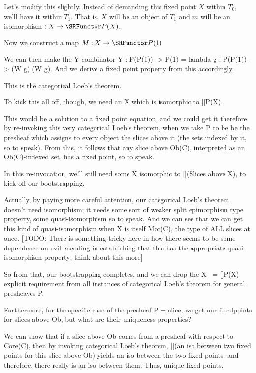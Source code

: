 Let's modify this slightly. Instead of demanding this fixed point $X$ within $T_0$, we'll have it within $T_1$. That is, $X$ will be an object of $T_1$ and $m$ will be an isomorphism $: X \to \SRFunctor P(X)$.

Now we construct a map $M : X \to \SRFunctor P(1)$

We can then make the Y combinator Y : P(P(1)) -> P(1) = lambda g : P(P(1)) -> (W g) (W g). And we derive a fixed point property from this accordingly.

This is the categorical Loeb’s theorem.

To kick this all off, though, we need an X which is isomorphic to []P(X).

This would be a solution to a fixed point equation, and we could get it therefore by re-invoking this very categorical Loeb’s theorem, when we take P to be be the presheaf which assigns to every object the slices above it (the sets indexed by it, so to speak). From this, it follows that any slice above Ob(C), interpreted as an Ob(C)-indexed set, has a fixed point, so to speak.

In this re-invocation, we’ll still need some X isomorphic to [](Slices above X), to kick off our bootstrapping.

Actually, by paying more careful attention, our categorical Loeb’s theorem doesn’t need isomorphism; it needs some sort of weaker split epimorphism type property, some quasi-isomorphism so to speak. And we can see that we can get this kind of quasi-isomorphism when X is itself Mor(C), the type of ALL slices at once. [TODO: There is something tricky here in how there seems to be some dependence on evil encoding in establishing that this has the appropriate quasi-isomorphism property; think about this more]

So from that, our bootstrapping completes, and we can drop the X ~= []P(X) explicit requirement from all instances of categorical Loeb’s theorem for general presheaves P.

Furthermore, for the specific case of the presheaf P = slice, we get our fixedpoints for slices above Ob, but what are their uniqueness properties?

We can show that if a slice above Ob comes from a presheaf with respect to Core(C), then by invoking categorical Loeb’s theorem, [](an iso between two fixed points for this slice above Ob) yields an iso between the two fixed points, and therefore, there really is an iso between them. Thus, unique fixed points.

